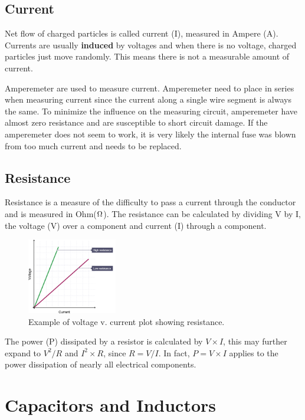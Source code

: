 \documentclass{article}
\begin{document}
\subsection{Current}

Net flow of charged particles is called current (I), measured in Ampere (A). Currents are usually \textbf{induced} by voltages and when there is no voltage, charged particles just move randomly. This means there is not a measurable amount of current. \par
Amperemeter are used to measure current. Amperemeter need to place in series when measuring current since the current along a single wire segment is always the same. To minimize the influence on the measuring circuit, amperemeter have almost zero resistance and are susceptible to short circuit damage. If the amperemeter does not seem to work, it is very likely the internal fuse was blown from too much current and needs to be replaced.

\subsection{Resistance}

Resistance is a measure of the difficulty to pass a current through the conductor and is measured in Ohm($\ohm$). The resistance can be calculated by dividing V by I, the voltage (V) over a component and current (I) through a component. \par

\begin{figure}[!h]
	\center
	\includegraphics[width=0.35\textwidth, keepaspectratio]{rvi}
	\caption{Example of voltage v. current plot showing resistance.}
	\label{fig:rvi}
\end{figure}

The power (P) dissipated by a resistor is calculated by $V\times I$, this may further expand to $V^2/R$ and $I^2\times R$, since $R=V/I$. In fact, $P=V\times I$ applies to the power dissipation of nearly all electrical components.

\section{Capacitors and Inductors}
\end{document}
